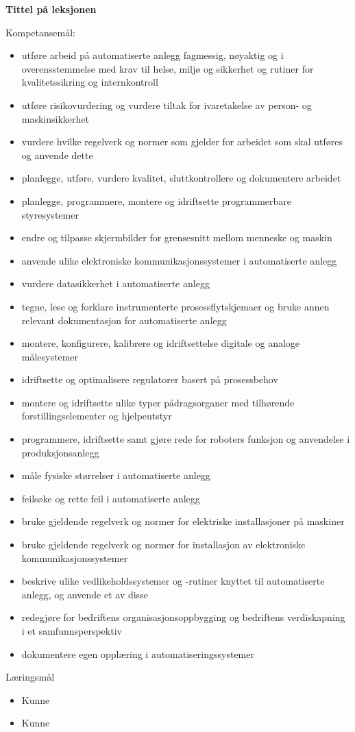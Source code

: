 \documentclass[12pt,a4paper]{article}
\begin{document}
\centerline{\bf Tittel på leksjonen}  \bigskip

Kompetansemål:
\begin{itemize}[noitemsep]

	\item utføre arbeid på automatiserte anlegg fagmessig, nøyaktig og i overensstemmelse med krav til helse, miljø og sikkerhet og rutiner for kvalitetssikring og internkontroll
	\item utføre risikovurdering og vurdere tiltak for ivaretakelse av person- og maskinsikkerhet
	\item vurdere hvilke regelverk og normer som gjelder for arbeidet som skal utføres og anvende dette
	\item planlegge, utføre, vurdere kvalitet, sluttkontrollere og dokumentere arbeidet
	\item planlegge, programmere, montere og idriftsette programmerbare styresystemer
	\item endre og tilpasse skjermbilder for grensesnitt mellom menneske og maskin
	\item anvende ulike elektroniske kommunikasjonssystemer i automatiserte anlegg
	\item vurdere datasikkerhet i automatiserte anlegg
	\item tegne, lese og forklare instrumenterte prosessflytskjemaer og bruke annen relevant dokumentasjon for automatiserte anlegg
	\item montere, konfigurere, kalibrere og idriftsettelse digitale og analoge målesystemer
	\item idriftsette og optimalisere regulatorer basert på prosessbehov
	\item montere og idriftsette ulike typer pådragsorganer med tilhørende forstillingselementer og hjelpeutstyr
	\item programmere, idriftsette samt gjøre rede for roboters funksjon og anvendelse i produksjonsanlegg
	\item måle fysiske størrelser i automatiserte anlegg
	\item feilsøke og rette feil i automatiserte anlegg
	\item bruke gjeldende regelverk og normer for elektriske installasjoner på maskiner
	\item bruke gjeldende regelverk og normer for installasjon av elektroniske kommunikasjonssystemer
	\item beskrive ulike vedlikeholdssystemer og -rutiner knyttet til automatiserte anlegg, og anvende et av disse
	\item redegjøre for bedriftens organisasjonsoppbygging og bedriftens verdiskapning i et samfunnsperspektiv
	\item dokumentere egen opplæring i automatiseringssystemer
\end{itemize}
	Læringsmål
	\begin{itemize}[noitemsep]
		\item Kunne 
		\item Kunne 
	\end{itemize}
\end{document}
